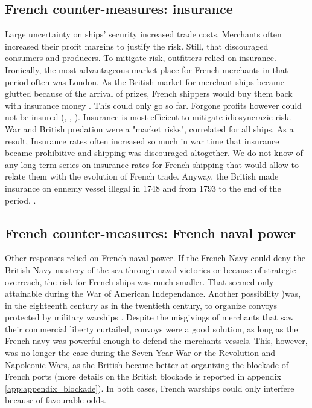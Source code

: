 \documentclass[12pt,a4paper,notitlepage,english]{article}
\begin{document}




 
 
 \subsection{French counter-measures: insurance}
 

Large uncertainty on ships’ security increased trade costs.
Merchants often increased their profit margins to justify the risk.
 Still, that discouraged consumers and producers.
To mitigate risk, outfitters relied on insurance.
Ironically, the most advantageous market place for French merchants in that period often was London.
As the British market for merchant ships became glutted because of the arrival of prizes, French shippers would buy them back with insurance money \citep[p. 55]{Tracy1991}. 
This could only go so far.
Forgone profits however could not be insured (\cite[p. 160]{Ducoin1993}, \cite{Villiers2002}, \citep[p. 690-720]{Butel1973}).
Insurance is most efficient to mitigate idiosyncrazic risk.
War and British predation were a "market risks", correlated  for all ships.
As a result, Insurance rates often increased so much in war time that insurance became prohibitive and shipping was discouraged altogether.
We do not know of any long-term series on insurance rates for French shipping that would allow to relate them with the evolution of French trade.
Anyway, the British made insurance on ennemy vessel illegal in 1748 and from 1793 to the end of the period. \citep[p.55]{Tracy1991}.

 \subsection{French counter-measures: French naval power}
 
Other responses relied on French naval power.
If the French Navy could deny the British Navy mastery of the sea through naval victories or because of strategic overreach, the risk for French ships was much smaller.
That seemed only attainable during the War of American Independance. 
Another possibility )was, in the eighteenth century as in the twentieth century, to organize convoys protected by military warships \cite[p. 393, 407, 448, 641]{Villiers2002}.
Despite the misgivings of merchants that saw their commercial liberty curtailed, convoys were a good solution, as long as the French navy was powerful enough to defend the merchants vessels.
This, however, was no longer the case during the Seven Year War or the Revolution and Napoleonic Wars, as the British became better at organizing the blockade of French ports (more details on the British blockade is reported in appendix \ref{app:appendix_blockade}).
In both cases, French warships could only interfere because of favourable odds.
\end{document}
